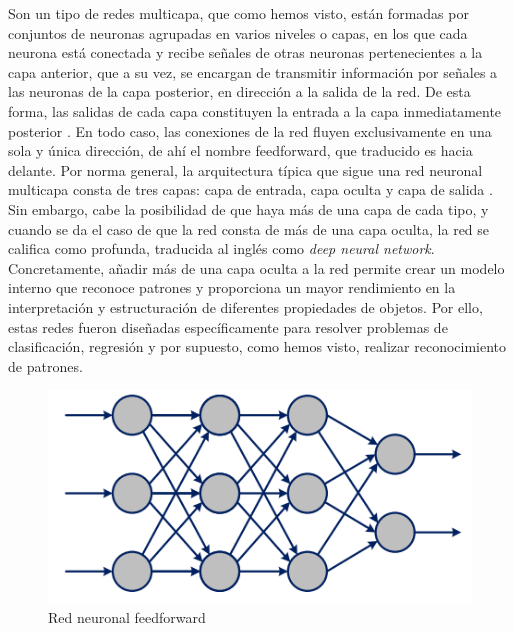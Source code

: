Son un tipo de redes multicapa, que como hemos visto, están formadas por conjuntos de neuronas agrupadas en varios niveles o capas, en los que cada neurona está conectada y recibe señales de otras neuronas pertenecientes a la capa anterior, que a su vez, se encargan de transmitir información por señales a las neuronas de la capa posterior, en dirección a la salida de la red. De esta forma, las salidas de cada capa constituyen la entrada a la capa inmediatamente posterior \citep{russell2016artificial}. En todo caso, las conexiones de la red fluyen exclusivamente en una sola y única dirección, de ahí el nombre feedforward, que traducido es hacia delante. Por norma general, la arquitectura típica que sigue una red neuronal multicapa consta de tres capas: capa de entrada, capa oculta y capa de salida \citep{berzal2019redes}. \\

Sin embargo, cabe la posibilidad de que haya más de una capa de cada tipo, y cuando se da el caso de que la red consta de más de una capa oculta, la red se califica como profunda, traducida al inglés como \textit{deep neural network}. Concretamente, añadir más de una capa oculta a la red permite crear un modelo interno que reconoce patrones y proporciona un mayor rendimiento en la interpretación y estructuración de diferentes propiedades de objetos. Por ello, estas redes fueron diseñadas específicamente para resolver problemas de clasificación, regresión y por supuesto, como hemos visto, realizar reconocimiento de patrones.\\

\begin{figure}[h]
	\centering
	\includegraphics[width = 1 \textwidth]{Imagenes/Vectorial/feedforward.png}
	\caption{Red neuronal feedforward \citep{berzal2019redes}}
	\label{fig:feedforward}
\end{figure}



